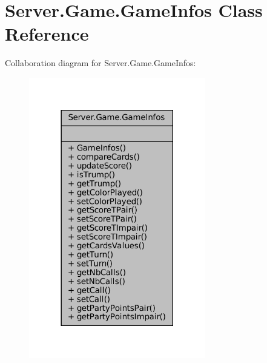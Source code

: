 \hypertarget{classServer_1_1Game_1_1GameInfos}{}\section{Server.\+Game.\+Game\+Infos Class Reference}
\label{classServer_1_1Game_1_1GameInfos}


Collaboration diagram for Server.\+Game.\+Game\+Infos\+:
\nopagebreak
\begin{figure}[H]
\begin{center}
\leavevmode
\includegraphics[width=218pt]{classServer_1_1Game_1_1GameInfos__coll__graph}
\end{center}
\end{figure}
